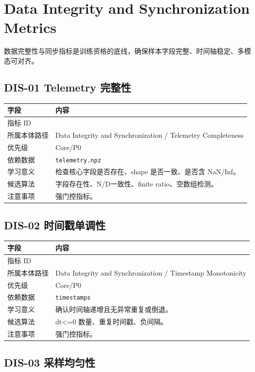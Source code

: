 \documentclass[UTF8,zihao=-4]{ctexart}
\newcommand{\Code}[1]{\texttt{#1}}
\newcommand{\MID}[1]{\texttt{\seqsplit{#1}}}
\begin{document}
\section{Data Integrity and Synchronization Metrics}

数据完整性与同步指标是训练资格的底线，确保样本字段完整、时间轴稳定、多模态可对齐。


\subsection{DIS-01 Telemetry 完整性}

\begin{longtable}{L{3.6cm} L{9.6cm}}
\toprule
字段 & 内容 \\
\midrule
指标 ID & \MID{DIS-01} \\
所属本体路径 & Data Integrity and Synchronization / Telemetry Completeness \\
优先级 & Core/P0 \\
依赖数据 & \Code{telemetry.npz} \\
学习意义 & 检查核心字段是否存在、shape 是否一致、是否含 NaN/Inf。 \\
候选算法 & 字段存在性、N/D一致性、finite ratio、空数组检测。 \\
注意事项 & 强门控指标。 \\
\bottomrule
\end{longtable}

\subsection{DIS-02 时间戳单调性}

\begin{longtable}{L{3.6cm} L{9.6cm}}
\toprule
字段 & 内容 \\
\midrule
指标 ID & \MID{DIS-02} \\
所属本体路径 & Data Integrity and Synchronization / Timestamp Monotonicity \\
优先级 & Core/P0 \\
依赖数据 & \Code{timestamps} \\
学习意义 & 确认时间轴递增且无异常重复或倒退。 \\
候选算法 & dt<=0 数量、重复时间戳、负间隔。 \\
注意事项 & 强门控指标。 \\
\bottomrule
\end{longtable}

\subsection{DIS-03 采样均匀性}
\end{document}
